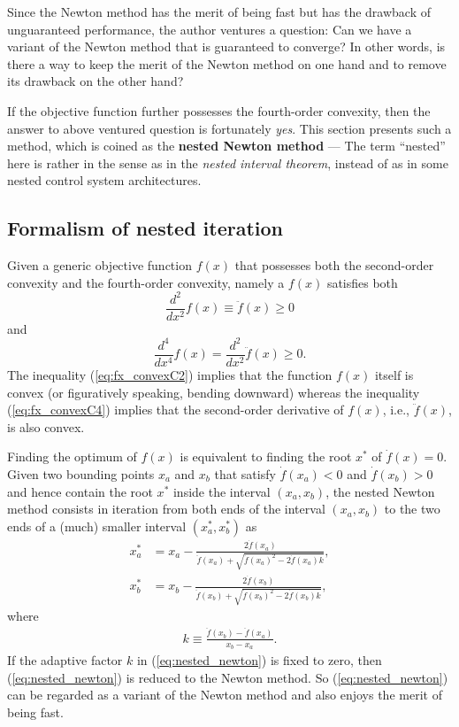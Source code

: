 \documentclass[12pt]{article}
\begin{document}
Since the Newton method has the merit of being fast but has the drawback of unguaranteed performance, the author ventures a question: Can we have a variant of the Newton method that is guaranteed to converge? In other words, is there a way to keep the merit of the Newton method on one hand and to remove its drawback on the other hand? 

If the objective function further possesses the fourth-order convexity, then the answer to above ventured question is fortunately \textit{yes}. This section presents such a method, which is coined as the \textbf{nested Newton method} --- The term ``nested'' here is rather in the sense as in the \textit{nested interval theorem}, instead of as in some nested control system architectures.

\subsection{Formalism of nested iteration}

Given a generic objective function $f(x)$ that possesses both the second-order convexity and the fourth-order convexity, namely a $f(x)$ satisfies both
\begin{equation} \label{eq:fx_convexC2}
\frac{d^2}{d x^2} f(x) \equiv \ddot{f}(x) \geq 0
\end{equation}
and
\begin{equation} \label{eq:fx_convexC4}
\frac{d^4}{d x^4} f(x) = \frac{d^2}{d x^2} \ddot{f}(x) \geq 0.
\end{equation}
The inequality (\ref{eq:fx_convexC2}) implies that the function $f(x)$ itself is convex (or figuratively speaking, bending downward) whereas the inequality (\ref{eq:fx_convexC4}) implies that the second-order derivative of $f(x)$, i.e., $\ddot{f}(x)$, is also convex.

Finding the optimum of $f(x)$ is equivalent to finding the root $x^*$ of $\dot{f}(x) = 0$. Given two bounding points $x_a$ and $x_b$ that satisfy $\dot{f}(x_a) < 0$ and $\dot{f}(x_b)>0$ and hence contain the root $x^*$ inside the interval $(x_a, x_b)$, the nested Newton method consists in iteration from both ends of the interval $(x_a, x_b)$ to the two ends of a (much) smaller interval $(x_a^*, x_b^*)$ as
\begin{subequations}  \label{eq:nested_newton}
\begin{align}
x_a^* &= x_a - \frac{2 \dot{f}(x_a)}{\ddot{f}(x_a) + \sqrt{\ddot{f}(x_a)^2 - 2 \dot{f}(x_a) k}},  \\
x_b^* &= x_b - \frac{2 \dot{f}(x_b)}{\ddot{f}(x_b) + \sqrt{\ddot{f}(x_b)^2 - 2 \dot{f}(x_b) k}},
\end{align}
\end{subequations}
where
\begin{align*}
k \equiv \frac{\ddot{f}(x_b) - \ddot{f}(x_a)}{x_b - x_a}.
\end{align*}
If the adaptive factor $k$ in (\ref{eq:nested_newton}) is fixed to zero, then (\ref{eq:nested_newton}) is reduced to the Newton method. So (\ref{eq:nested_newton}) can be regarded as a variant of the Newton method and also enjoys the merit of being fast.
\end{document}
